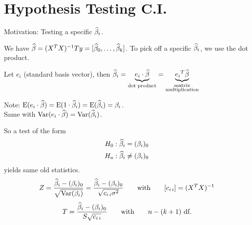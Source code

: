 \section{Hypothesis Testing C.I.}
Motivation: Testing a specific $\widehat{\beta}_i$.

\nl We have $\widehat{\beta} = (X^TX)^{-1}Ty = [\widehat{\beta}_0, \dots, \widehat{\beta}_k]$. To pick off a specific $\widehat{\beta}_i$, we use the dot product.

\nl Let $e_i$ (standard basis vector), then $\displaystyle \widehat{\beta}_i = \underbrace{e_i \cdot \widehat{\beta}}_{\text{dot product}} = \underbrace{{e_i}^T \widehat{\beta}}_{\substack{\text{matrix} \\ \text{multiplication}}}$

\nl Note: $\E*{e_i \cdot \betah} = \E*{1 \cdot \betah_i} = \E*{\betah_i} = \beta_i$.
\\ Same with $\Var*{e_i \cdot \betah} = \Var*{\betah_i}$.

\nl So a test of the form
\begin{align*}
    H_0 &: \widehat{\beta}_i = (\beta_i)_0\\
    H_a &: \widehat{\beta}_i \neq (\beta_i)_0
\end{align*}
yields same old statistics.
$$Z = \frac{\betah_i - (\beta_i)_0}{\sqrt{\Var*{\beta_i}}} = \frac{\betah_i - (\beta_i)_0}{\sqrt{c_{i\,i}\sigma^2}} \qquad \text{with} \qquad [c_{i\,i}] = (X^TX)^{-1}$$
$$T = \frac{\widehat{\beta}_i - (\beta_i)_0}{S \sqrt{c_{i\,i}}} \qquad \text{with} \qquad n-(k+1) \text{ df.}$$

